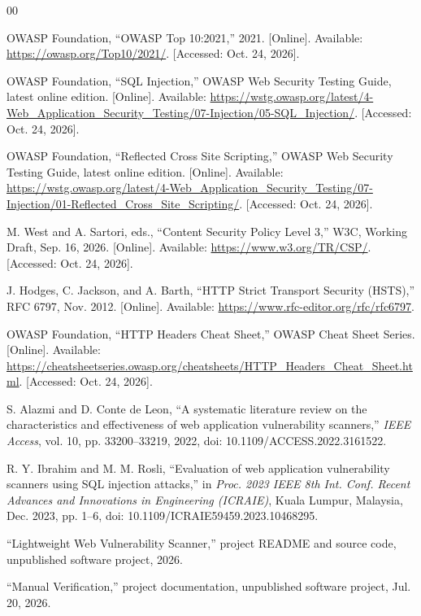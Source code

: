 \documentclass[conference]{IEEEtran}
\begin{document}
\begin{thebibliography}{00}

OWASP Foundation, ``OWASP Top 10:2021,'' 2021. [Online]. Available:
\url{https://owasp.org/Top10/2021/}. [Accessed: Oct. 24, 2026].

OWASP Foundation, ``SQL Injection,'' OWASP Web Security Testing Guide, latest
online edition. [Online]. Available:
\url{https://wstg.owasp.org/latest/4-Web_Application_Security_Testing/07-Injection/05-SQL_Injection/}.
 [Accessed: Oct. 24, 2026].

OWASP Foundation, ``Reflected Cross Site Scripting,'' OWASP Web Security
Testing Guide, latest online edition. [Online]. Available:
\url{https://wstg.owasp.org/latest/4-Web_Application_Security_Testing/07-Injection/01-Reflected_Cross_Site_Scripting/}.
 [Accessed: Oct. 24, 2026].

M. West and A. Sartori, eds., ``Content Security Policy Level 3,'' W3C,
Working Draft, Sep. 16, 2026. [Online]. Available:
\url{https://www.w3.org/TR/CSP/}. [Accessed: Oct. 24, 2026].

J. Hodges, C. Jackson, and A. Barth, ``HTTP Strict Transport Security
(HSTS),'' RFC 6797, Nov. 2012. [Online]. Available:
\url{https://www.rfc-editor.org/rfc/rfc6797}.

OWASP Foundation, ``HTTP Headers Cheat Sheet,'' OWASP Cheat Sheet Series.
[Online]. Available:
\url{https://cheatsheetseries.owasp.org/cheatsheets/HTTP_Headers_Cheat_Sheet.html}.
 [Accessed: Oct. 24, 2026].

S. Alazmi and D. Conte de Leon, ``A systematic literature review on the
characteristics and effectiveness of web application vulnerability scanners,''
\emph{IEEE Access}, vol. 10, pp. 33200--33219, 2022, doi:
10.1109/ACCESS.2022.3161522.

R. Y. Ibrahim and M. M. Rosli, ``Evaluation of web application vulnerability
scanners using SQL injection attacks,'' in \emph{Proc. 2023 IEEE 8th Int. Conf.
Recent Advances and Innovations in Engineering (ICRAIE)}, Kuala Lumpur,
Malaysia, Dec. 2023, pp. 1--6, doi: 10.1109/ICRAIE59459.2023.10468295.

``Lightweight Web Vulnerability Scanner,'' project README and source code,
unpublished software project, 2026.

``Manual Verification,'' project documentation, unpublished software project,
Jul. 20, 2026.

\end{thebibliography}
\end{document}
